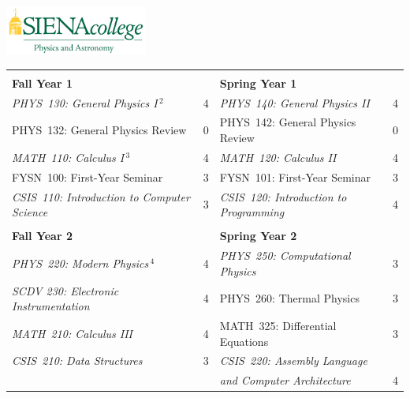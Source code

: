 \documentclass[12pt]{article}
\begin{document}
\hfill \includegraphics[width=0.35\textwidth]{siena_phys_astro_print_crop.jpg}

\vspace{0.1cm}
\vspace{0.3cm}

\vspace*{-5mm}
\begin{table}[h!]
\begin{center}
{\renewcommand{\arraystretch}{1.2}
\begin{tabular*}{0.9\textwidth}{@{\extracolsep{\fill}}lclc}
 & \\
{\Large \textbf{Fall Year 1}} & & {\Large \textbf{Spring Year 1}} & \\
\hline
{\em PHYS~130: General Physics I}\,$^{2}$  & 4 & {\em PHYS~140: General Physics II}     & 4 \\
PHYS~132: General Physics Review           & 0 & PHYS~142: General Physics Review & 0\\
{\em MATH~110: Calculus I}\,$^{3}$         & 4 & {\em MATH~120: Calculus II}            & 4 \\
FYSN~100: First-Year Seminar               & 3 & FYSN~101: First-Year Seminar     & 3\\
{\em CSIS~110: Introduction to Computer Science}    & 3 & 
{\em CSIS~120: Introduction to Programming}  & 4 \\

 & \\
{\Large \textbf{Fall Year 2}} & & {\Large \textbf{Spring Year 2}} & \\
\hline
{\em PHYS~220: Modern Physics}\,$^{4}$      & 4 & 
{\em PHYS~250: Computational Physics}      & 3 \\
{\em SCDV 230: Electronic Instrumentation} & 4 &
PHYS~260: Thermal Physics                  & 3  \\
{\em MATH~210: Calculus III}               & 4 & MATH~325: Differential Equations & 3 \\
{\em CSIS~210: Data Structures}    & 3 & 
{\em CSIS~220: Assembly Language} & \\
& & {\em and Computer Architecture}  & 4 \\



\end{tabular*}
}
\end{center}
\end{table}
\end{document}
